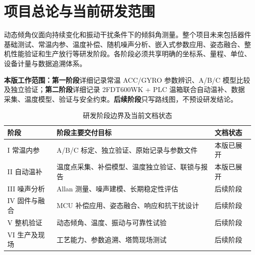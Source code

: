 \chapter*{项目总论与当前研发范围}
动态倾角仪面向持续变化和振动干扰条件下的倾斜角测量。整个项目未来包括器件基础测试、常温内参、温度补偿、随机噪声分析、嵌入式参数应用、姿态融合、整机性能验证和生产放行等研发阶段。各阶段必须共享明确的坐标系、量程、单位、设备计量与数据追溯体系。

\begin{notice}
\textbf{本版工作范围：}\textbf{第一阶段}详细记录常温 ACC/GYRO 参数辨识、A/B/C 模型比较及独立验证；\textbf{第二阶段}详细记录 2FDT600WK + PLC 温箱联合自动温补、数据采集、温度模型、验证与安全约束。\textbf{后续阶段}只写路线图，不预设研发结论。
\end{notice}

\begin{table}[htbp]\centering\small
\caption{研发阶段边界及当前文档状态}\label{tab:phases}
\begin{tabularx}{\linewidth}{@{}p{30mm}Yp{33mm}@{}}\toprule
阶段 & 阶段主要交付目标 & 文档状态\\\midrule
I 常温内参 & A/B/C 标定、独立验证、原始记录与参数文件 & 本版已展开\\
II 自动温补 & 温度点采集、补偿模型、温度独立验证、联锁与报告 & 本版已展开\\
III 噪声分析 & Allan 测量、噪声建模、长期稳定性评估 & 后续阶段\\
IV 固件与融合 & MCU 补偿应用、姿态融合、响应和抗干扰设计 & 后续阶段\\
V 整机验证 & 动态倾角、温度、振动与可靠性试验 & 后续阶段\\
VI 生产及现场 & 工艺能力、参数追溯、塔筒现场测试 & 后续阶段\\\bottomrule
\end{tabularx}\end{table}
\clearpage
